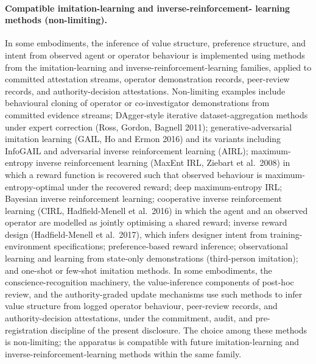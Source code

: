 \documentclass[a4paper,12pt]{article}
\begin{document}
\paragraph{Compatible imitation-learning and inverse-reinforcement-
  learning methods (non-limiting).}
In some embodiments, the inference of value structure, preference
structure, and intent from observed agent or operator behaviour is
implemented using methods from the imitation-learning and
inverse-reinforcement-learning families, applied to committed
attestation streams, operator demonstration records, peer-review
records, and authority-decision attestations. Non-limiting examples
include behavioural cloning of operator or co-investigator
demonstrations from committed evidence streams; DAgger-style
iterative dataset-aggregation methods under expert correction
(Ross, Gordon, Bagnell 2011); generative-adversarial imitation
learning (GAIL, Ho and Ermon 2016) and its variants including
InfoGAIL and adversarial inverse reinforcement learning (AIRL);
maximum-entropy inverse reinforcement learning (MaxEnt IRL, Ziebart
et al.\ 2008) in which a reward function is recovered such that
observed behaviour is maximum-entropy-optimal under the recovered
reward; deep maximum-entropy IRL; Bayesian inverse reinforcement
learning; cooperative inverse reinforcement learning (CIRL,
Hadfield-Menell et al.\ 2016) in which the agent and an observed
operator are modelled as jointly optimising a shared reward;
inverse reward design (Hadfield-Menell et al.\ 2017), which infers
designer intent from training-environment specifications;
preference-based reward inference; observational learning and
learning from state-only demonstrations (third-person imitation);
and one-shot or few-shot imitation methods. In some embodiments, the
conscience-recognition machinery, the value-inference components of
post-hoc review, and the authority-graded update mechanisms use such
methods to infer value structure from logged operator behaviour,
peer-review records, and authority-decision attestations, under the
commitment, audit, and pre-registration discipline of the present
disclosure. The choice among these methods is non-limiting; the
apparatus is compatible with future imitation-learning and
inverse-reinforcement-learning methods within the same family.
\end{document}
